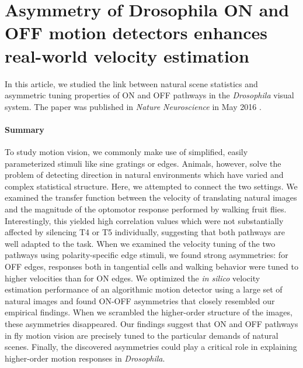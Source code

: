 \section{Asymmetry of Drosophila ON and OFF motion detectors enhances real-world velocity estimation}
\label{sct:manuscript_leonhardt}

In this article, we studied the link between natural scene statistics and asymmetric tuning properties of ON and OFF pathways in the \textit{Drosophila} visual system. The paper was published in \textit{Nature Neuroscience} in May 2016 \citep{Leonhardt:2016ex}.

\paragraph{Summary}
To study motion vision, we commonly make use of simplified, easily parameterized stimuli like sine gratings or edges. Animals, however, solve the problem of detecting direction in natural environments which have varied and complex statistical structure. Here, we attempted to connect the two settings. We examined the transfer function between the velocity of translating natural images and the magnitude of the optomotor response performed by walking fruit flies. Interestingly, this yielded high correlation values which were not substantially affected by silencing T4 or T5 individually, suggesting that both pathways are well adapted to the task. When we examined the velocity tuning of the two pathways using polarity-specific edge stimuli, we found strong asymmetries: for OFF edges, responses both in tangential cells and walking behavior were tuned to higher velocities than for ON edges. We optimized the \textit{in silico} velocity estimation performance of an algorithmic motion detector using a large set of natural images and found ON-OFF asymmetries that closely resembled our empirical findings. When we scrambled the higher-order structure of the images, these asymmetries disappeared. Our findings suggest that ON and OFF pathways in fly motion vision are precisely tuned to the particular demands of natural scenes. Finally, the discovered asymmetries could play a critical role in explaining higher-order motion responses in \textit{Drosophila}.

